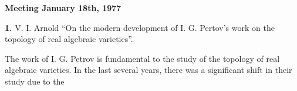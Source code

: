 \documentclass{article}
\begin{document}
\noindent\textbf{Meeting January 18th, 1977}

\textbf{1.} V. I. Arnold ``On the modern development of I. G. Pertov's work on
the topology of real algebraic varieties''.

The work of I. G. Petrov is fundamental to the study of the topology of real
algebraic varieties.
In the last several years, there was a significant shift in their study due to
the 
\end{document}
